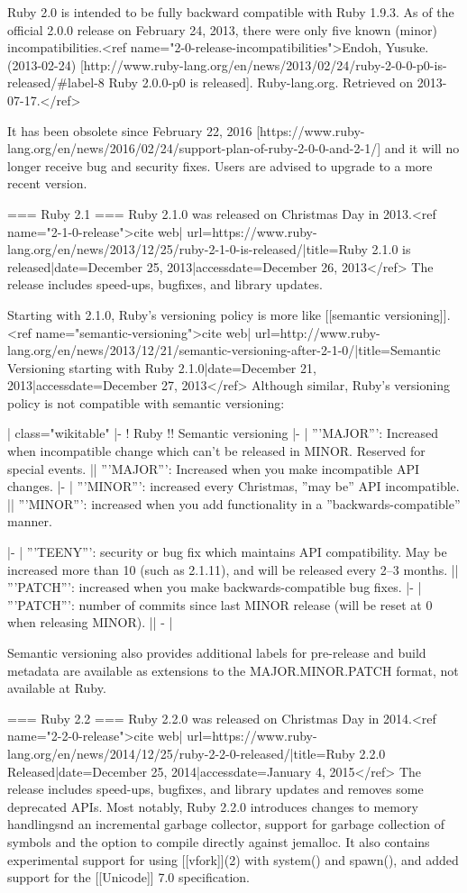 Ruby 2.0 is intended to be fully backward compatible with Ruby 1.9.3. As of the official 2.0.0 release on February 24, 2013, there were only five known (minor) incompatibilities.<ref name="2-0-release-incompatibilities">Endoh, Yusuke. (2013-02-24) [http://www.ruby-lang.org/en/news/2013/02/24/ruby-2-0-0-p0-is-released/#label-8 Ruby 2.0.0-p0 is released]. Ruby-lang.org. Retrieved on 2013-07-17.</ref>

It has been obsolete since February 22, 2016 [https://www.ruby-lang.org/en/news/2016/02/24/support-plan-of-ruby-2-0-0-and-2-1/] and it will no longer receive bug and security fixes. Users are advised to upgrade to a more recent version.

=== Ruby 2.1 ===
Ruby 2.1.0 was released on Christmas Day in 2013.<ref name="2-1-0-release">{{cite web| url=https://www.ruby-lang.org/en/news/2013/12/25/ruby-2-1-0-is-released/|title=Ruby 2.1.0 is released|date=December 25, 2013|accessdate=December 26, 2013}}</ref> The release includes speed-ups, bugfixes, and library updates.

Starting with 2.1.0, Ruby's versioning policy is more like [[semantic versioning]].<ref name="semantic-versioning">{{cite web| url=http://www.ruby-lang.org/en/news/2013/12/21/semantic-versioning-after-2-1-0/|title=Semantic Versioning starting with Ruby 2.1.0|date=December 21, 2013|accessdate=December 27, 2013}}</ref> Although similar, Ruby's versioning policy is not compatible with semantic versioning:

{| class="wikitable"
|-
! Ruby !! Semantic versioning
|-
| '''MAJOR''': Increased when incompatible change which can’t be released in MINOR. Reserved for special events. || '''MAJOR''': Increased when you make incompatible API changes.
|-
| '''MINOR''': increased every Christmas, ''may be'' API incompatible. || '''MINOR''': increased when you add functionality in a ''backwards-compatible'' manner.

|-
| '''TEENY''': security or bug fix which maintains API compatibility. May be increased more than 10 (such as 2.1.11), and will be released every 2–3 months. || '''PATCH''': increased when you make backwards-compatible bug fixes.
|-
| '''PATCH''': number of commits since last MINOR release (will be reset at 0 when releasing MINOR).
 || -
|}

Semantic versioning also provides additional labels for pre-release and build metadata are available as extensions to the MAJOR.MINOR.PATCH format, not available at Ruby.

=== Ruby 2.2 ===
Ruby 2.2.0 was released on Christmas Day in 2014.<ref name="2-2-0-release">{{cite web| url=https://www.ruby-lang.org/en/news/2014/12/25/ruby-2-2-0-released/|title=Ruby 2.2.0 Released|date=December 25, 2014|accessdate=January 4, 2015}}</ref> The release includes speed-ups, bugfixes, and library updates and removes some deprecated APIs.  Most notably, Ruby 2.2.0 introduces changes to memory handling{{snd}} an incremental garbage collector, support for garbage collection of symbols and the option to compile directly against jemalloc.  It also contains experimental support for using [[vfork]](2) with system() and spawn(), and added support for the [[Unicode]] 7.0 specification.

